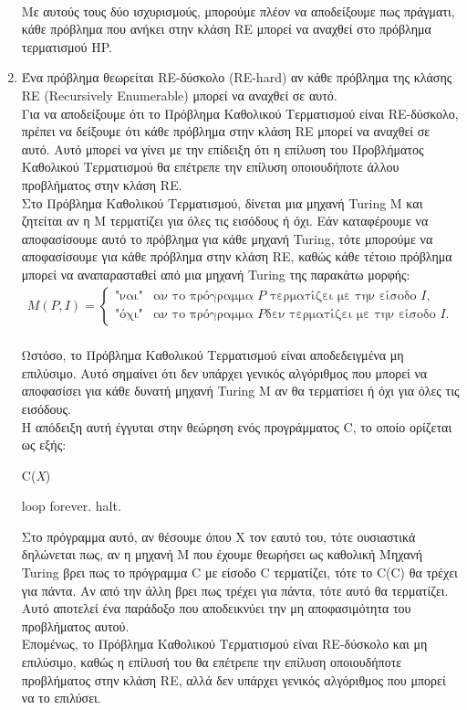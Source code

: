 \documentclass{article}
\begin{document}
\begin{enumerate}[label=(\alph*)]
\\
Με αυτούς τους δύο ισχυρισμούς, μπορούμε πλέον να αποδείξουμε πως πράγματι, κάθε πρόβλημα που ανήκει στην κλάση RE μπορεί να αναχθεί στο πρόβλημα τερματισμού HP.  
 \item Ένα πρόβλημα θεωρείται RE-δύσκολο (RE-hard) αν κάθε πρόβλημα της κλάσης RE (Recursively Enumerable) μπορεί να αναχθεί σε αυτό. 
\\
Για να αποδείξουμε ότι το Πρόβλημα Καθολικού Τερματισμού είναι RE-δύσκολο, πρέπει να δείξουμε ότι κάθε πρόβλημα στην κλάση RE μπορεί να αναχθεί σε αυτό. Αυτό μπορεί να γίνει με την επίδειξη ότι η επίλυση του Προβλήματος Καθολικού Τερματισμού θα επέτρεπε την επίλυση οποιουδήποτε άλλου προβλήματος στην κλάση RE.
\\
Στο Πρόβλημα Καθολικού Τερματισμού, δίνεται μια μηχανή Turing M και ζητείται αν η M τερματίζει για όλες τις εισόδους ή όχι. Εάν καταφέρουμε να αποφασίσουμε αυτό το πρόβλημα για κάθε μηχανή Turing, τότε μπορούμε να αποφασίσουμε για κάθε πρόβλημα στην κλάση RE, καθώς κάθε τέτοιο πρόβλημα μπορεί να αναπαρασταθεί από μια μηχανή Turing της παρακάτω μορφής:
\\
\begin{align*}
M(P,I) = 
\begin{cases} 
\text{"ναι"} & \text{αν το πρόγραμμα } P \text{ τερματίζει με την είσοδο } I, \\
\text{"όχι"} & \text{αν το πρόγραμμα } P \text{δεν τερματίζει με την είσοδο } I.
\end{cases}
\end{align*}
\\
Ωστόσο, το Πρόβλημα Καθολικού Τερματισμού είναι αποδεδειγμένα μη επιλύσιμο. Αυτό σημαίνει ότι δεν υπάρχει γενικός αλγόριθμος που μπορεί να αποφασίσει για κάθε δυνατή μηχανή Turing M αν θα τερματίσει ή όχι για όλες τις εισόδους.
\\
Η απόδειξη αυτή έγγυται στην θεώρηση ενός προγράμματος C, το οποίο ορίζεται ως εξής: 
\\
\begin{algorithm}[H]
\caption{C(\textit{X})}
\begin{algorithmic}[1]
        \State loop forever.
    \Else
        \State halt.
    \EndIf
\end{algorithmic}
\end{algorithm}
Στο πρόγραμμα αυτό, αν θέσουμε όπου Χ τον εαυτό του, τότε ουσιαστικά δηλώνεται πως, αν η μηχανή Μ που έχουμε θεωρήσει ως καθολική Μηχανή Turing βρει πως το πρόγραμμα C με είσοδο C τερματίζει, τότε το C(C) θα τρέχει για πάντα. Αν από την άλλη βρει πως τρέχει για πάντα, τότε αυτό θα τερματίζει. Αυτό αποτελεί ένα παράδοξο που αποδεικνύει την μη αποφασιμότητα του προβλήματος αυτού. 
\\
Επομένως, το Πρόβλημα Καθολικού Τερματισμού είναι RE-δύσκολο και μη επιλύσιμο, καθώς η επίλυσή του θα επέτρεπε την επίλυση οποιουδήποτε προβλήματος στην κλάση RE, αλλά δεν υπάρχει γενικός αλγόριθμος που μπορεί να το επιλύσει.
\end{enumerate}
\end{document}
